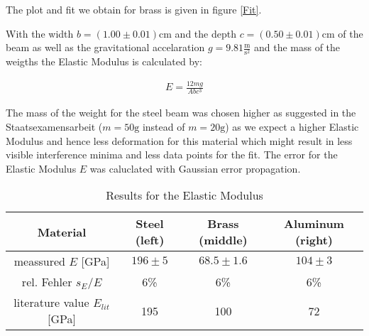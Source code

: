 The plot and fit we obtain for brass is given in figure \ref{Fit}.


With the width  $b=(1.00\pm0.01)\mathrm{cm}$ and the depth  $c=(0.50\pm0.01)\mathrm{cm}$ of the beam as well as the gravitational accelaration $g=9.81\frac{\mathrm{m}}{\mathrm{s}^2}$ and the mass of the weigths the Elastic Modulus is calculated by: 

\begin{align}
E=\frac{12mg}{Abc^3}
\end{align}

The mass of the weight for the steel beam was chosen higher as suggested in the Staatsexamensarbeit \cite{staat} ($m=50\mathrm{g}$ instead of $m=20\mathrm{g}$) as we expect a higher Elastic Modulus and hence less deformation for this material  which might result in less visible interference minima and less data points for the fit.
The error for the Elastic Modulus $E$ was caluclated with Gaussian error propagation.

\begin{table}[h!]
	\centering
	\begin{tabular}{c|c|c|c}
		Material							& Steel (left)	& Brass (middle)	& Aluminum (right)\\ \hline\hline
		meassured $E$ [GPa]			& $196\pm5$	& $68.5\pm1.6$			& $104\pm3$			\\ \hline
		rel. Fehler $s_E/E$				& $6$\%			& $6$\%				& $6$\%				\\ \hline
	literature value \cite{staat} $E_{lit}$ [GPa]	& 195			& 100				& 72
	\end{tabular}
	\caption{Results for the Elastic Modulus}
\end{table}
